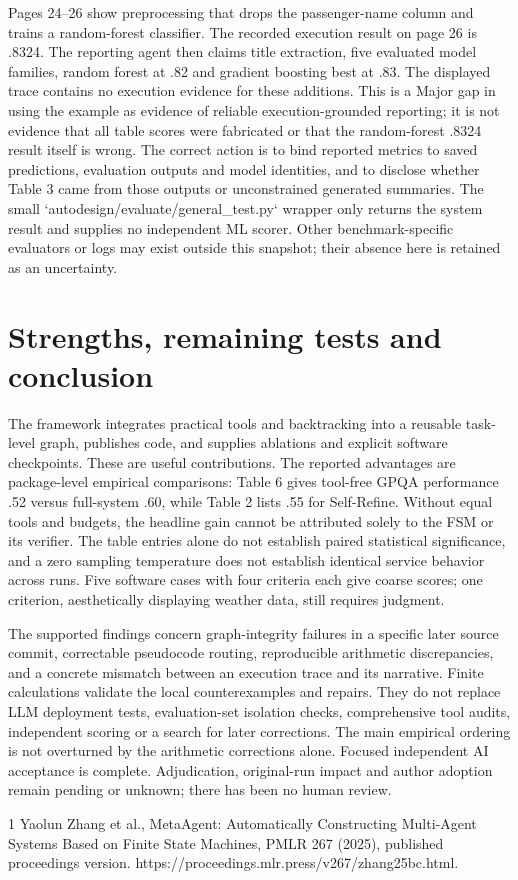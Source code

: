 \documentclass[10pt]{article}
\begin{document}
Pages 24–26 show preprocessing that drops the passenger-name column and trains a random-forest classifier. The recorded execution result on page 26 is .8324. The reporting agent then claims title extraction, five evaluated model families, random forest at .82 and gradient boosting best at .83. The displayed trace contains no execution evidence for these additions. This is a Major gap in using the example as evidence of reliable execution-grounded reporting; it is not evidence that all table scores were fabricated or that the random-forest .8324 result itself is wrong. The correct action is to bind reported metrics to saved predictions, evaluation outputs and model identities, and to disclose whether Table 3 came from those outputs or unconstrained generated summaries. The small `autodesign/evaluate/general\_test.py` wrapper only returns the system result and supplies no independent ML scorer. Other benchmark-specific evaluators or logs may exist outside this snapshot; their absence here is retained as an uncertainty.\par
\section*{Strengths, remaining tests and conclusion}
The framework integrates practical tools and backtracking into a reusable task-level graph, publishes code, and supplies ablations and explicit software checkpoints. These are useful contributions. The reported advantages are package-level empirical comparisons: Table 6 gives tool-free GPQA performance .52 versus full-system .60, while Table 2 lists .55 for Self-Refine. Without equal tools and budgets, the headline gain cannot be attributed solely to the FSM or its verifier. The table entries alone do not establish paired statistical significance, and a zero sampling temperature does not establish identical service behavior across runs. Five software cases with four criteria each give coarse scores; one criterion, aesthetically displaying weather data, still requires judgment.\par
The supported findings concern graph-integrity failures in a specific later source commit, correctable pseudocode routing, reproducible arithmetic discrepancies, and a concrete mismatch between an execution trace and its narrative. Finite calculations validate the local counterexamples and repairs. They do not replace LLM deployment tests, evaluation-set isolation checks, comprehensive tool audits, independent scoring or a search for later corrections. The main empirical ordering is not overturned by the arithmetic corrections alone. Focused independent AI acceptance is complete. Adjudication, original-run impact and author adoption remain pending or unknown; there has been no human review.\par
1 Yaolun Zhang et al., MetaAgent: Automatically Constructing Multi-Agent Systems Based on Finite State Machines, PMLR 267 (2025), published proceedings version. https://proceedings.mlr.press/v267/zhang25bc.html.\par
\end{document}
